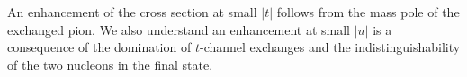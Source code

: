 \bigskip

An enhancement of the cross section at small $|t|$ follows from the mass pole
of the exchanged pion. We also understand an enhancement at small $|u|$ is
a consequence of  the domination of $t$-channel exchanges 
and the indistinguishability of the two nucleons in the final state.


\begin{comment}
Integral expression of the scattering matrix element in Eq. (\ref{eqn:scYSelem}) 
is written in terms of the Feynman diagram as
\begin{figure}[h]
\vspace*{30mm}
\special{psfile="\feynmfdirectory/01NNtoNNeq/NNtoNN.eps" hscale=70 vscale=70 voffset=30 hoffset=70}
\label{fig:scalarYNN2NNinEq}
\end{figure}


&&
\unitlength=1mm  %
\parbox{40mm}
{
\begin{fmffile}{NNbyPi1}
	\begin{fmfgraph*}(40,20)
			\fmfleft{i1,i2}
			\fmfright{o1,o2} 
			\fmflabel{$p_b$}{i1}
			\fmflabel{$p_a$}{i2}
			\fmflabel{$p_2$}{o1}
			\fmflabel{$p_1$}{o2}
			\fmf{fermion,tension=2}{i1,v1,o1}
			\fmf{fermion,tension=2}{i2,v2,o2}
			\fmf{dashes}{v1,v2}
	\end{fmfgraph*}
\end{fmffile}
}
\hspace{3mm}
+
\hspace{3mm}
\parbox{40mm}
{
\begin{fmffile}{NNbyPi2}
	\begin{fmfgraph*}(40,20)
			\fmfleft{i1,i2}
			\fmfright{o1,o2} 
			\fmflabel{$p_b$}{i1}
			\fmflabel{$p_a$}{i2}
			\fmflabel{$p_1$}{o1}
			\fmflabel{$p_2$}{o2}
			\fmf{fermion,tension=2}{i1,v1,o1}
			\fmf{fermion,tension=2}{i2,v2,o2}
			\fmf{dashes}{v1,v2}
	\end{fmfgraph*}
\end{fmffile}
}
\end{comment}

\bigskip

